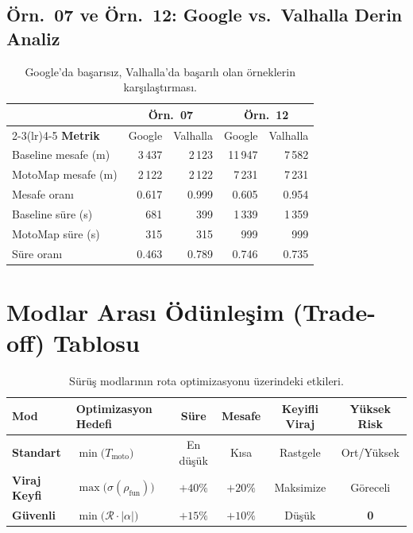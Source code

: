 \documentclass[11pt,a4paper]{article}
\theoremstyle{definition}
\begin{document}
\subsection{\"Orn.\ 07 ve \"Orn.\ 12: Google vs.\ Valhalla Derin Analiz}

\begin{table}[H]
\centering
\caption{Google'da ba\c{s}ar{\i}s{\i}z, Valhalla'da ba\c{s}ar{\i}l{\i}
         olan \"orneklerin kar\c{s}{\i}la\c{s}t{\i}rmas{\i}.}
\label{tab:deep-samples}
\renewcommand{\arraystretch}{1.25}
\begin{tabular}{l rr rr}
\toprule
& \multicolumn{2}{c}{\textbf{\"Orn.\ 07}} & \multicolumn{2}{c}{\textbf{\"Orn.\ 12}} \\
\cmidrule(lr){2-3}\cmidrule(lr){4-5}
\textbf{Metrik}        & Google  & Valhalla & Google   & Valhalla \\
\midrule
Baseline mesafe (m)     & 3\,437  & 2\,123   & 11\,947  & 7\,582 \\
MotoMap mesafe (m)      & 2\,122  & 2\,122   & 7\,231   & 7\,231 \\
Mesafe oran{\i}         & \cellcolor{failbg}0.617 & \cellcolor{passbg}0.999
                        & \cellcolor{failbg}0.605 & \cellcolor{passbg}0.954 \\
\midrule
Baseline s\"ure (s)     & 681     & 399      & 1\,339   & 1\,359 \\
MotoMap s\"ure (s)      & 315     & 315      & 999      & 999    \\
S\"ure oran{\i}         & \cellcolor{failbg}0.463 & \cellcolor{passbg}0.789
                        & 0.746   & 0.735  \\
\bottomrule
\end{tabular}
\end{table}

\section{Modlar Aras{\i} \"Od\"unle\c{s}im
         (Trade-off) Tablosu}\label{sec:tradeoff}

\begin{table}[H]
\centering
\caption{S\"ur\"u\c{s} modlar{\i}n{\i}n rota optimizasyonu
         \"uzerindeki etkileri.}
\label{tab:tradeoff}
\renewcommand{\arraystretch}{1.3}
\begin{tabular}{>{\bfseries}l p{3.4cm} cccc}
\toprule
Mod & Optimizasyon Hedefi
    & S\"ure & Mesafe & Keyifli Viraj & Y\"uksek Risk \\
\midrule
Standart
  & $\min\bigl(T_{\mathrm{moto}}\bigr)$
  & En d\"u\c{s}\"uk & Kısa & Rastgele & Ort/Y\"uksek \\
Viraj Keyfi
  & $\max\bigl(\sigma(\rho_{\text{fun}})\bigr)$
  & $\mathord{+}40\%$ & $\mathord{+}20\%$ & Maksimize & G\"oreceli \\
G\"uvenli
  & $\min\bigl(\mathcal{R}\cdot|\alpha|\bigr)$
  & $\mathord{+}15\%$ & $\mathord{+}10\%$ & D\"u\c{s}\"uk & \textbf{0} \\
\bottomrule
\end{tabular}
\end{table}
\end{document}
